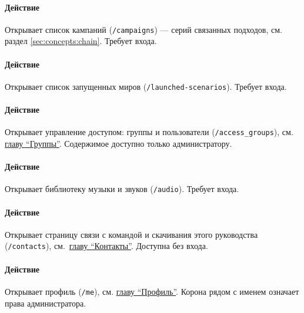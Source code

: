\paragraph{Действие}
Открывает список кампаний (\texttt{/campaigns}) --- серий связанных подходов, см. раздел \ref{sec:concepts:chain}. Требует входа.

\paragraph{Действие}
Открывает список запущенных миров (\texttt{/launched-scenarios}). Требует входа.

\paragraph{Действие}
Открывает управление доступом: группы и пользователи (\texttt{/access\_groups}), см. \hyperref[url:access-groups]{главу ``Группы''}. Содержимое доступно только администратору.

\paragraph{Действие}
Открывает библиотеку музыки и звуков (\texttt{/audio}). Требует входа.

\paragraph{Действие}
Открывает страницу связи с командой и скачивания этого руководства (\texttt{/contacts}), см.\ \hyperref[url:contacts]{главу ``Контакты''}. Доступна без входа.

\paragraph{Действие}
Открывает профиль (\texttt{/me}), см. \hyperref[url:me]{главу ``Профиль''}. Корона рядом с именем означает права администратора.

